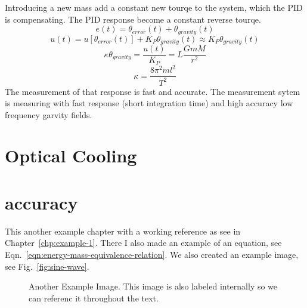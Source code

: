 \documentclass[\main/master.tex]{subfiles}
\begin{document}
Introducing a new mass add a constant new tourqe to the system, which the PID is compensating. The PID response become a constant reverse tourqe. 
\begin{equation}
e(t) = \theta_{error}(t) + \theta_{gravity}(t)    \label{eqn:PID_measurement}
\end{equation}
\begin{equation}
u(t) = u[ \theta_{error}(t)] + K_P\theta_{gravity}(t) \approx K_P\theta_{gravity}(t)\label{eqn:PID_measurement_eq}
\end{equation}
\begin{equation}
\kappa\theta_{gravity} =\frac{u(t)}{K_P} = L\frac{GmM}{r^2}    \label{eqn:pid_gravitation_tourqe}
\end{equation}
\begin{equation}
\kappa =\frac{8\pi^2ml^2}{T^2}    \label{eqn:empirical_tourqe}
\end{equation}
The measurement of that response is fast and accurate. The measurement sytem is measuring with fast response (short integration time) and high accuracy low frequency garvity fields. 




\section{Optical Cooling}

\section{accuracy}
\doublespacing
\hspace{5 mm} This another example chapter with a working reference as see in Chapter~\ref{chp:example-1}. There I also made an example of an equation, see Eqn.~\ref{eqn:energy-mass-equivalence-relation}. We also created an example image, see Fig.~\ref{fig:sine-wave}.
\begin{figure}[htbp]
	\centering
	\caption[Another Example Image]{Another Example Image. This image is also labeled internally so we can referenc it throughout the text.}
	\label{fig:cosine-wave}
\end{figure}
\end{document}
